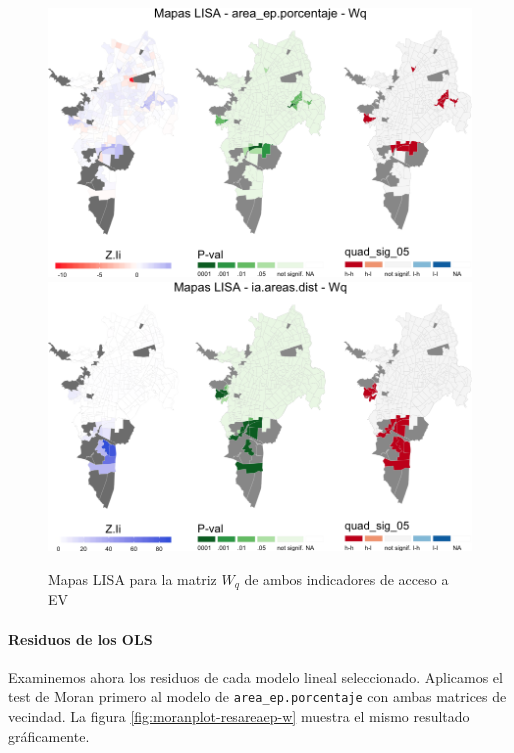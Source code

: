 \documentclass[12pt,]{book}
\let\oldparagraph\paragraph
\renewcommand{\paragraph}[1]{\oldparagraph{#1}\mbox{}}
\begin{document}
\begin{figure}
\includegraphics[width=1\linewidth]{tesis-unigis_files/figure-latex/mapas-lisa-ev-wq-1} \includegraphics[width=1\linewidth]{tesis-unigis_files/figure-latex/mapas-lisa-ev-wq-2} \caption{Mapas LISA para la matriz $W_q$ de ambos indicadores de acceso a EV}\label{fig:mapas-lisa-ev-wq}
\end{figure}

\paragraph{Residuos de los OLS}\label{residuos-de-los-ols}

Examinemos ahora los residuos de cada modelo lineal seleccionado.
Aplicamos el test de Moran primero al modelo de
\texttt{area\_ep.porcentaje} con ambas matrices de vecindad. La figura
\ref{fig:moranplot-resareaep-w} muestra el mismo resultado gráficamente.
\end{document}
